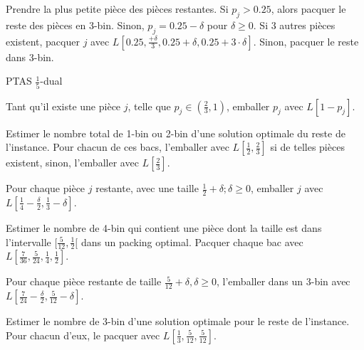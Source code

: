 \documentclass[a4paper,12pt]{report}
\theoremstyle{plain}				%
\theoremstyle{definition}				%
\begin{document}
\begin{appendices}
\begin{algorithm}[H]
\BlankLine %
Prendre la plus petite pièce des pièces restantes. Si $p_j > 0.25$,
alors pacquer le reste des pièces en 3-bin.
Sinon, $p_j = 0.25 - \delta$ pour $\delta \geq 0$.
Si $3$ autres pièces existent, pacquer $j$
 avec $L[0.25, \frac{+\delta}{3}, 0.25 + \delta, 0.25 + 3 \cdot \delta]$.
Sinon, pacquer le reste dans 3-bin.


\caption{PTAS $\frac{1}{5}$-dual}
\label{algo:PTASDual1_5}
\end{algorithm}

\bigskip

\begin{algorithm}[H]
\DontPrintSemicolon

Tant qu'il existe une pièce $j$, telle que $p_j \in (\frac{2}{3},1)$,
emballer $p_j$ avec $L[1-p_j]$.

\BlankLine %
Estimer le nombre total de 1-bin ou 2-bin d'une solution optimale du
reste de l'instance.
Pour chacun de ces bacs, l'emballer avec $L[\frac{1}{2}, \frac{2}{3}]$
si de telles pièces existent, sinon, l'emballer avec $L[\frac{2}{3}]$.

\BlankLine %

\BlankLine %
Pour chaque pièce $j$ restante, avec une taille $\frac{1}{2}+\delta;
\delta \geq 0$, emballer $j$ avec $L[\frac{1}{4}-\frac{\delta}{2},
\frac{1}{3}-\delta]$.

\BlankLine %
Estimer le nombre de 4-bin qui contient une pièce dont la taille est
dans l'intervalle $[\frac{5}{12}, \frac{1}{2}[$ dans un packing
optimal. Pacquer chaque bac avec $L[ \frac{7}{36}, \frac{5}{24},
\frac{1}{4}, \frac{1}{2}]$.

Pour chaque pièce restante de taille
$\frac{5}{12}+\delta, \delta \geq 0$, l'emballer dans un 3-bin avec
$L[\frac{7}{24}-\frac{\delta}{2}, \frac{5}{12}-\delta]$.

\BlankLine %
Estimer le nombre de 3-bin d'une solution optimale pour le reste de
l'instance. Pour chacun d'eux, le pacquer avec $L[\frac{1}{3},
\frac{5}{12}, \frac{5}{12}]$.

\BlankLine %


\end{algorithm}
\end{appendices}
\end{document}
